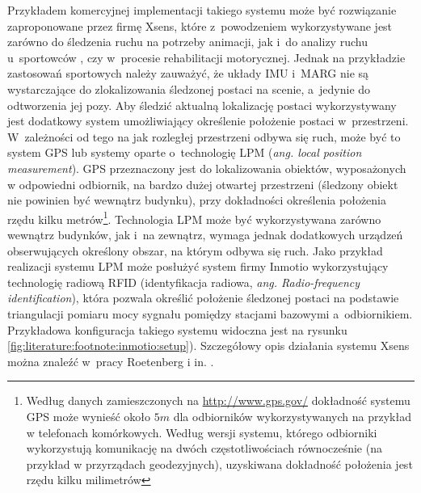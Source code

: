 Przykładem komercyjnej implementacji takiego systemu może być rozwiązanie zaproponowane przez firmę Xsens, które z~powodzeniem wykorzystywane jest zarówno do śledzenia ruchu na potrzeby animacji{}, jak i~do analizy ruchu u~sportowców {}, czy w~procesie rehabilitacji motorycznej{}. Jednak na przykładzie zastosowań sportowych{} należy zauważyć, że układy IMU i~MARG nie są wystarczające do zlokalizowania śledzonej postaci na scenie, a~jedynie do odtworzenia jej pozy. Aby śledzić aktualną lokalizację postaci wykorzystywany jest dodatkowy system umożliwiający określenie położenie postaci w~przestrzeni. W~zależności od tego na jak rozległej przestrzeni odbywa się ruch, może być to system GPS lub systemy oparte o~technologię LPM (\emph{ang. local position measurement}). GPS przeznaczony jest do lokalizowania obiektów, wyposażonych w odpowiedni odbiornik, na bardzo dużej otwartej przestrzeni (śledzony obiekt nie powinien być wewnątrz budynku), przy dokładności określenia położenia rzędu kilku metrów{\footnote{Według danych zamieszczonych na \url{http://www.gps.gov/} dokładność systemu GPS może wynieść około $5m$ dla odbiorników wykorzystywanych na przykład w telefonach komórkowych. Według wersji systemu, którego  odbiorniki wykorzystują komunikację na dwóch częstotliwościach równocześnie (na przykład w przyrządach geodezyjnych), uzyskiwana dokładność położenia jest rzędu kilku milimetrów}}. Technologia LPM może być wykorzystywana zarówno wewnątrz budynków, jak i~na zewnątrz, wymaga jednak dodatkowych urządzeń obserwujących określony obszar, na którym odbywa się ruch. Jako przykład realizacji systemu LPM może posłużyć system firmy Inmotio wykorzystujący technologię radiową RFID (identyfikacja radiowa, \emph{ang. Radio-frequency identification}), która pozwala określić położenie śledzonej postaci na podstawie triangulacji pomiaru mocy sygnału pomiędzy stacjami bazowymi a~odbiornikiem. Przykładowa konfiguracja takiego systemu widoczna jest na rysunku \ref{fig:literature:footnote:inmotio:setup}). Szczegółowy opis działania systemu Xsens można znaleźć w~pracy Roetenberg i in. \cite{Roetenberg2009}.
					
